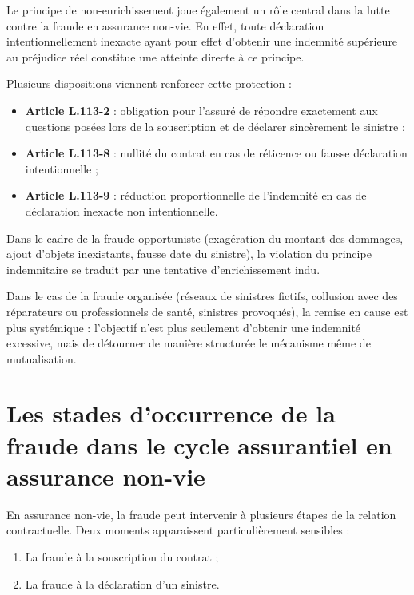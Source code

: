 Le principe de non-enrichissement joue également un rôle central dans la lutte contre la fraude en assurance non-vie. En effet, toute déclaration intentionnellement inexacte ayant pour effet d'obtenir une indemnité supérieure au préjudice réel constitue une atteinte directe à ce principe.

\underline{Plusieurs dispositions viennent renforcer cette protection :}

\begin{itemize}[label=\textbullet]
    \item \textbf{Article L.113-2} : obligation pour l'assuré de répondre exactement aux questions posées lors de la souscription et de déclarer sincèrement le sinistre ;
    \item \textbf{Article L.113-8} : nullité du contrat en cas de réticence ou fausse déclaration intentionnelle ;
    \item \textbf{Article L.113-9} : réduction proportionnelle de l'indemnité en cas de déclaration inexacte non intentionnelle.
\end{itemize}

Dans le cadre de la fraude opportuniste (exagération du montant des dommages, ajout d'objets inexistants, fausse date du sinistre), la violation du principe indemnitaire se traduit par une tentative d'enrichissement indu.

Dans le cas de la fraude organisée (réseaux de sinistres fictifs, collusion avec des réparateurs ou professionnels de santé, sinistres provoqués), la remise en cause est plus systémique : l'objectif n'est plus seulement d'obtenir une indemnité excessive, mais de détourner de manière structurée le mécanisme même de mutualisation.

\section{Les stades d'occurrence de la fraude dans le cycle assurantiel en assurance non-vie}

En assurance non-vie, la fraude peut intervenir à plusieurs étapes de la relation contractuelle. Deux moments apparaissent particulièrement sensibles :

\begin{enumerate}
    \item La fraude à la souscription du contrat ;
    \item La fraude à la déclaration d'un sinistre.
\end{enumerate}

